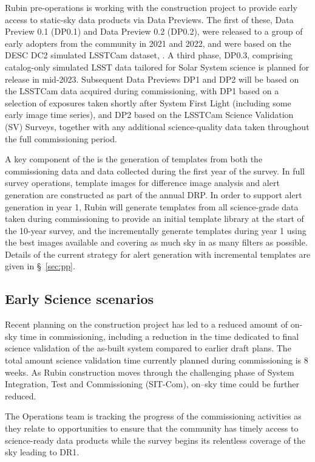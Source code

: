 Rubin pre-operations is working with the construction project to provide early access to static-sky data products via Data Previews.
The first of these, Data Preview 0.1 (DP0.1) and Data Preview 0.2 (DP0.2), were released to a group of early adopters from the community in 2021 and 2022, and were based on the DESC DC2 simulated LSSTCam dataset, \citep{2021ApJS..253...31L}.
A third phase, DP0.3, comprising catalog-only simulated LSST data tailored for Solar System science is planned for release in mid-2023.
Subsequent Data Previews DP1 and DP2 will be based on the LSSTCam data acquired during commissioning, with DP1 based on a selection of exposures taken shortly after System First Light (including some early image time series), and DP2 based on the LSSTCam Science Validation (SV) Surveys, together with any additional science-quality data taken throughout the full commissioning period.

A key component of the \esp is the generation of templates from both the commissioning data and data collected during the first year of the survey.
In full survey operations, template images for difference image analysis and alert generation are constructed as part of the annual DRP.
In order to support alert generation in year 1, Rubin will generate templates from all science-grade data taken during commissioning to provide an initial template library at the start of the 10-year survey, and the incrementally generate templates during year 1 using the best images available and covering as much sky in as many filters as possible.
Details of the current strategy for alert generation  with incremental templates are given in  \S~\ref{sec:pp}.


\subsection{Early Science scenarios } \label{ssec:scenarios}

Recent planning on the construction project has led to a reduced amount of on-sky time in commissioning, including a reduction in the time dedicated to final science validation of the as-built system compared to earlier draft plans.
The total amount science validation time currently planned during commissioning is 8 weeks.
As Rubin construction moves through the challenging phase of System Integration, Test and Commissioning (SIT-Com), on--sky time could be further reduced.

The Operations team is tracking the progress of the commissioning activities as they relate to \es opportunities to ensure that the community has timely access to science-ready data products while the survey begins its relentless coverage of the sky leading to DR1.

